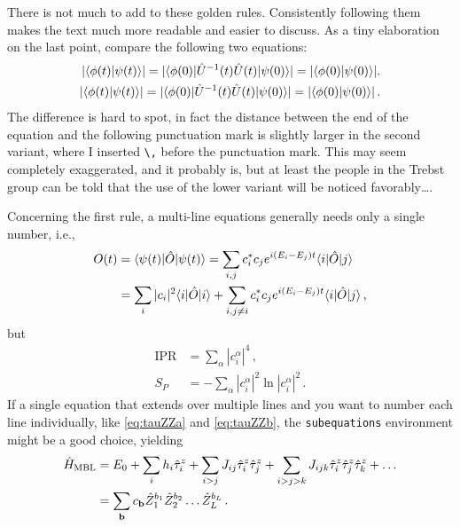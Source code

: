 There is not much to add to these golden rules. Consistently following them makes the text much more readable and easier to discuss. As a tiny elaboration on the last point, compare the following two equations:
\begin{align}
	|\langle \phi (t) | \psi(t) \rangle| = |\langle \phi(0) | \hat{U}^{-1}(t) \hat{U}(t) | \psi(0)  \rangle| = |\langle \phi (0) | \psi(0) \rangle|. \\ 
	|\langle \phi (t) | \psi(t) \rangle| = |\langle \phi(0) | \hat{U}^{-1}(t) \hat{U}(t) | \psi(0)  \rangle| = |\langle \phi (0) | \psi(0) \rangle|\,.
\end{align}
The difference is hard to spot, in fact the distance between the end of the equation and the following punctuation mark is slightly larger in the second variant, where I inserted \verb|\,| before the punctuation mark.
This may seem completely exaggerated, and it probably is, but at least the people in the Trebst group can be told that the use of the lower variant will be noticed favorably\ldots.

Concerning the first rule, a multi-line equations generally needs only a single number, i.e.,
\begin{align}
	O(t) &= \langle \psi(t) | \hat{O} | \psi(t) \rangle = \sum_{i,j} c_i^* c_j e^{i \left( E_i - E_j \right)t} \langle i |\hat{O}| j\rangle  \nonumber \\ & = \sum_i |c_i|^2 \langle i |\hat{O}| i \rangle + \sum_{i,j\neq i} c_i^*c_j e^{i \left( E_i - E_j \right) t} \langle i |\hat{O}| j\rangle\,,
\end{align}
but
\begin{align} 
	\mathrm{IPR} &= \sum_\alpha |c_i^\alpha|^4\,,\\
	S_P &= - \sum_\alpha |c_i^\alpha|^2 \ln |c_i^\alpha|^2 \,.
\end{align}
If a single equation that extends over multiple lines and you want to number each line individually, like \eqref{eq:tauZZa} and \eqref{eq:tauZZb}, the \verb|subequations| environment might be a good choice, yielding
\begin{subequations}
\begin{align}
	\hat{H}_\text{MBL} &= E_0 + \sum \limits_i h_i \hat{\tau}_i^z + \sum \limits_{i>j} J_{ij} \hat{\tau}_i^z \hat{\tau}_j^z + \sum \limits_{i>j>k} J_{ijk} \hat{\tau}_i^z \hat{\tau}_j^z \hat{\tau}_k^z + \dots \label{eq:tauZZa} \\&= \sum_{\textbf{b}} c_{\textbf{b}} \hat{Z}_1^{b_1} \hat{Z}_2^{b_2} \dots \hat{Z}_L^{b_L}\,. \label{eq:tauZZb}
\end{align}
\end{subequations}

